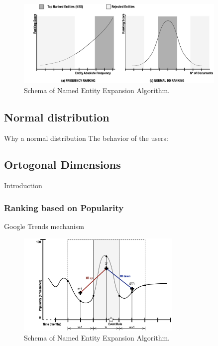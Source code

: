 \documentclass{llncs}
\begin{document}
\begin{figure}[h!]
\centering
\includegraphics[width=0.9\textwidth]{figure/RankingStrategies}
\caption{Schema of Named Entity Expansion Algorithm.}
\label{fig:namedEntityExpansion}%
\end{figure}

\subsection{Normal distribution}

Why a normal distribution
The behavior of the users:

\subsection{Ortogonal Dimensions}

Introduction

\subsubsection{Ranking based on Popularity}

Google Trends mechanism

\begin{figure}[h!]
\centering
\includegraphics[width=0.7\textwidth]{figure/PopularityMeasure}
\caption{Schema of Named Entity Expansion Algorithm.}
\label{fig:namedEntityExpansion}%
\end{figure}
\end{document}
